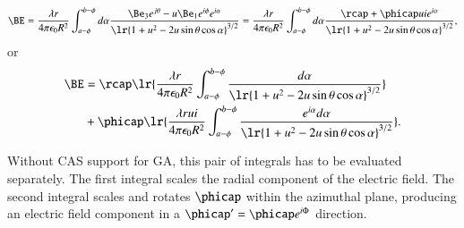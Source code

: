 \begin{dmath}\label{eqn:circularlinecharge:200}
\BE
= \frac{\lambda r}{4 \pi \epsilon_0 R^2} \int_{a-\phi}^{b-\phi} d\alpha \frac{ \Be_3 e^{j \theta } - u \Be_1 e^{i\phi} e^{i \alpha} }{\lr{ 1 + u^2 - 2 u \sin\theta \cos \alpha }^{3/2} }
= \frac{\lambda r}{4 \pi \epsilon_0 R^2} \int_{a-\phi}^{b-\phi} d\alpha \frac{ \rcap + \phicap u i e^{i \alpha } }{\lr{ 1 + u^2 - 2 u \sin\theta \cos \alpha }^{3/2} },
\end{dmath}
or
\begin{dmath}\label{eqn:circularlinecharge:220}
\begin{aligned}
\BE
&= \rcap \lr{ \frac{\lambda r}{4 \pi \epsilon_0 R^2} \int_{a-\phi}^{b-\phi} \frac{ d\alpha }{\lr{ 1 + u^2 - 2 u \sin\theta \cos \alpha }^{3/2} } } \\
&+ \phicap \lr{
\frac{\lambda r u i}{4 \pi \epsilon_0 R^2} \int_{a-\phi}^{b-\phi} \frac{ e^{i \alpha } d\alpha }{\lr{ 1 + u^2 - 2 u \sin\theta \cos \alpha }^{3/2} }
}.
\end{aligned}
\end{dmath}

Without CAS support for GA, this pair of integrals has to be evaluated separately.
The first integral
scales the radial component of the electric field.
The second integral scales and rotates \( \phicap \) within the azimuthal plane, producing an electric field component in a \( \phicap' = \phicap e^{i \Phi} \) direction.

